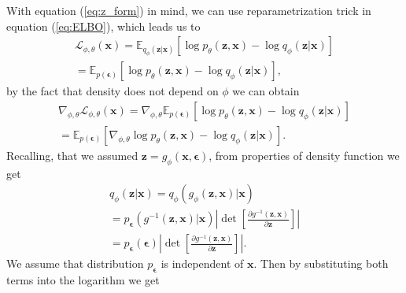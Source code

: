\documentclass[10pt]{article}
\begin{document}
With equation  (\ref{eq:z_form}) in mind, we can use reparametrization trick in equation (\ref{eq:ELBO}), which leads us to
\begin{gather}
    \mathcal{L}_{\phi, \theta}(\textbf{x}) 
    =  \mathbb{E}_{q_{\phi }(\textbf{z}|\textbf{x})}
    \left[ \log p_{\theta }(\textbf{z}, \textbf{x})  - \log q_{\phi }(\textbf{z}|\textbf{x}) \right] \\
    = \mathbb{E}_{p( \bm{\epsilon} )}
    \left[ \log p_{\theta }(\textbf{z}, \textbf{x})  - \log q_{\phi }(\textbf{z}|\textbf{x}) \right],
\end{gather}
by the fact that density does not depend on $\phi$ we can obtain
\begin{gather}
    \nabla_{\phi, \theta} \mathcal{L}_{\phi, \theta}(\textbf{x}) = \nabla_{\phi, \theta} \mathbb{E}_{p( \bm{\epsilon} )}
    \left[ \log p_{\theta }(\textbf{z}, \textbf{x})  - \log q_{\phi }(\textbf{z}|\textbf{x}) \right] \\
    = \mathbb{E}_{p( \bm{\epsilon} )}
    \left[\nabla_{\phi, \theta}  \log p_{\theta }(\textbf{z}, \textbf{x})  - \log q_{\phi }(\textbf{z}|\textbf{x}) \right]. 
\end{gather}
Recalling, that we assumed $ \textbf{z} = g_{ \phi}(\textbf{x}, \bm{\epsilon} )$, from properties of density function we get
\begin{gather}
    q_{\phi }(\textbf{z}|\textbf{x}) = 
    q_{\phi }(g_{ \phi}(\textbf{z}, \textbf{x}) | \textbf{x}) \\
     =  p_{\bm{\epsilon}}(g^{-1}(\textbf{z}, \textbf{x}) | \textbf{x}) 
      \left| \det \left[\frac{\partial g^{-1}(\textbf{z}, \textbf{x}) }{\partial \textbf{z}} \right]  \right| \\
     = p_{\bm{\epsilon}}(\bm{\epsilon}) 
     \left| \det \left[\frac{\partial g^{-1}(\textbf{z}, \textbf{x}) }{\partial \textbf{z}} \right] \right|.
\end{gather}
We assume that distribution $ p_{\bm{\epsilon}}$  is independent of $\textbf{x}$. Then by substituting both terms into the logarithm we get
\end{document}
